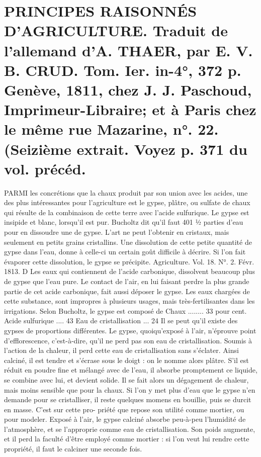 \setcounter{page}{41}
\section{PRINCIPES RAISONNÉS D'AGRICULTURE. Traduit de l'allemand d'A. THAER, par E. V. B. CRUD. Tom. Ier. in-4°, 372 p. Genève, 1811, chez J. J. Paschoud, Imprimeur-Libraire; et à Paris chez le même rue Mazarine, n°. 22. \large{(Seizième extrait. Voyez p. 371 du vol. précéd.}}
PARMI les concrétions que la chaux produit par son union avec les acides, une des plus intéressantes pour l'agriculture est le gypse, plâtre, ou sulfate de chaux qui résulte de la combinaison de cette terre avec l'acide sulfurique. Le gypse est insipide et blanc, lorsqu'il est pur. Bucholtz dit qu'il faut 401 ½ parties d'eau pour en dissoudre une de gypse. L'art ne peut l'obtenir en cristaux, mais seulement en petits grains cristallins.
Une dissolution de cette petite quantité de gypse dans l'eau, donne à celle-ci un certain goût difficile à décrire. Si l'on fait évaporer cette dissolution, le gypse se précipite.
Agriculture. Vol. 18. N°. 2. Févr. 1813. D\setcounter{page}{42} Les eaux qui contiennent de l'acide carbonique, dissolvent beaucoup plus de gypse que l'eau pure. Le contact de l'air, en lui faisant perdre la plus grande partie de cet acide carbonique, fait aussi déposer le gypse. Les eaux chargées de cette substance, sont impropres à plusieurs usages, mais très-fertilisantes dans les irrigations.
Selon Bucholtz, le gypse est composé de
Chaux ........ 33 pour cent.
Acide sulfurique .... 43
Eau de cristallisation ... 24
Il se peut qu'il existe des gypses de proportions différentes.
Le gypse, quoiqu'exposé à l'air, n'éprouve point d'efflorescence, c'est-à-dire, qu'il ne perd pas son eau de cristallisation. Soumis à l'action de la chaleur, il perd cette eau de cristallisation sans s'éclater. Ainsi calciné, il est tendre et s'écrase sous le doigt : on le nomme alors plâtre. S'il est réduit en poudre fine et mélangé avec de l'eau, il absorbe promptement ce liquide, se combine avec lui, et devient solide. Il se fait alors un dégagement de chaleur, mais moins sensible que pour la chaux. Si l'on y met plus d'eau que le gypse n'en demande pour se cristalliser, il reste quelques momens en bouillie, puis se durcit en masse. C'est sur cette pro-\setcounter{page}{43} priété que repose son utilité comme mortier, ou pour modeler.
Exposé à l'air, le gypse calciné absorbe peu-à-peu l'humidité de l'atmosphère, et se l'approprie comme eau de cristallisation. Son poids augmente, et il perd la faculté d'être employé comme mortier : si l'on veut lui rendre cette propriété, il faut le calciner une seconde fois.
